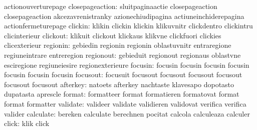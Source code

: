                            actionouverturepage
          closepageaction: sluitpaginaactie          closepageaction
                           closepageaction           akcezavrenistranky
                           azionechiudipagina        actiuneinchiderepagina
                           actionfermeturepage
                  clickin: klikin                    clickin
                           klickin                   klikuvnitr
                           clickdentro               clickintru
                           clicinterieur
                 clickout: klikuit                   clickout
                           klickaus                  klikvne
                           clickfuori                clickies
                           clicexterieur
                 regionin: gebiedin                  regionin
                           regionin                  oblastuvnitr
                           entraregione              regiuneintrare
                           entreregion
                regionout: gebieduit                 regionout
                           regionaus                 oblastvne
                           esciregione               regiuneiesire
                           regionexterieure
                  focusin: focusin                   focusin
                           focusin                   focusin
                           focusin                   focusin
                           focusin
                 focusout: focusuit                  focusout
                           focusout                  focusout
                           focusout                  focusout
                           focusout
                 afterkey: natoets                   afterkey
                           nachtaste                 klavesapo
                           dopotasto                 dupatasta
                           aprescle
                   format: formatteer                format
                           formatieren               formatovat
                           format                    format
                           formatter
                 validate: valideer                  validate
                           validieren                validovat
                           verifica                  verifica
                           valider
                calculate: bereken                   calculate
                           berechnen                 pocitat
                           calcola                   calculeaza
                           calculer
                    click: klik                      click
